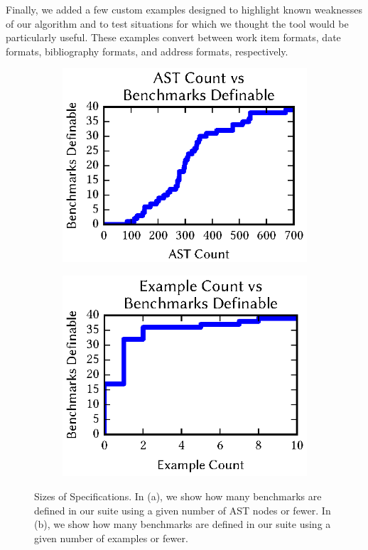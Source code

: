 \documentclass[12pt]{article}
\begin{document}
{Finally, we added a few custom examples designed to highlight known
weaknesses of our algorithm
and to test situations for which we thought the tool would be
particularly useful.
These examples convert between work item formats, date
formats, bibliography formats, and address formats, respectively.

\begin{figure}
  \centering
  \begin{subfigure}[b]{.49\textwidth}
    \centering
    \includegraphics{figs/specsizes}
    \caption{}
    \label{subfig:lenssize}
  \end{subfigure}
  \begin{subfigure}[b]{.49\textwidth}
    \includegraphics{figs/examplesused}
    \caption{}
    \label{subfig:examplesused}
  \end{subfigure}
  \caption{Sizes of Specifications.
    In (a), we show how many benchmarks are defined in our suite using a
    given number of AST nodes or fewer.
    In (b), we show how many benchmarks are defined in our suite using a
    given number of examples or fewer.}
  \label{fig:definition-sizes}
\end{figure}

}
\end{document}
